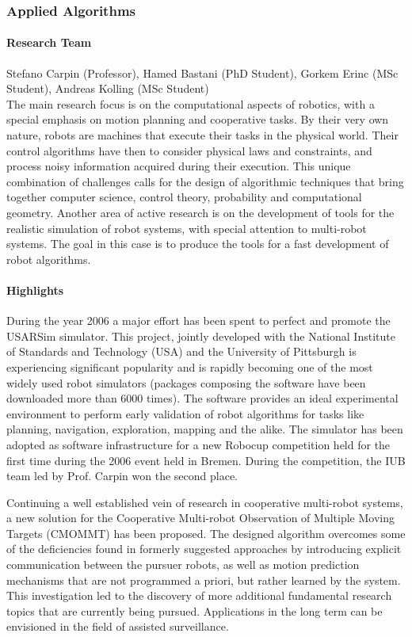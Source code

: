 
\subsubsection{Applied Algorithms}\label{ict:robotics:carpin}
\paragraph{Research Team}
Stefano Carpin (Professor), Hamed Bastani (PhD Student), Gorkem Erinc (MSc Student), Andreas Kolling (MSc Student)\\

The main research focus is on the computational aspects of
robotics, with a special emphasis on motion planning and
cooperative tasks. By their very own nature, robots are machines
that execute their tasks in the physical world. Their control
algorithms have then to consider physical laws and constraints,
and process noisy information acquired during their execution.
This unique combination of challenges calls for the design of
algorithmic techniques that bring together computer science,
control theory, probability and computational geometry. Another area of active
research is on the development of tools for the realistic
simulation of robot systems, with special attention to multi-robot
systems. The goal in this case is to produce the tools for a fast
development of robot algorithms.


\paragraph{Highlights}

During the year 2006 a major effort has been spent to perfect
and promote the USARSim simulator. This project, jointly
developed with the National  Institute of Standards and Technology (USA)
and the University of Pittsburgh is experiencing significant
popularity and is rapidly becoming one of the most widely
used robot simulators (packages composing the software have
been downloaded more than 6000 times). The software
provides an ideal experimental environment to perform early
validation of robot algorithms for tasks like planning, navigation,
exploration, mapping and the alike. The simulator has been adopted
as software infrastructure for a new Robocup competition held
for the first time during the 2006 event held in Bremen. During the
competition, the IUB team led by Prof. Carpin won the second place.

Continuing a well established vein of research in cooperative
multi-robot systems, a new solution for the Cooperative Multi-robot
Observation of Multiple Moving Targets (CMOMMT) has been proposed.
The designed algorithm overcomes some of the deficiencies found in
formerly suggested approaches by introducing explicit communication
between the pursuer robots, as well as motion prediction mechanisms
that are not programmed a priori, but rather learned by the system.
This investigation led to the discovery of more additional fundamental
research topics that are currently being pursued. Applications
in the long term can be envisioned in the field of assisted surveillance.

